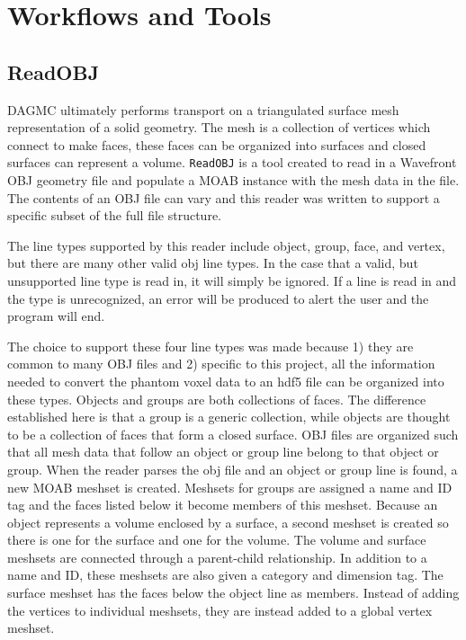 \clearpage
\section{Workflows and Tools}


\subsection{ReadOBJ}
DAGMC ultimately performs transport on a triangulated surface mesh representation of a solid geometry.
The mesh is a collection of vertices which connect to make faces, these faces can be organized into 
surfaces and closed surfaces can represent a volume.  \texttt{ReadOBJ} is a tool created to read in a Wavefront OBJ
geometry file and populate a MOAB instance with the mesh data in the file.  The contents of an OBJ file 
can vary \cite{obj} and this reader was written to support a specific subset of the full file structure. 

The line types supported by this reader include object, group, face, and vertex, 
but there are many other valid obj line types.  
In the case that a valid, but unsupported line type is read in, it will simply be ignored.  
If a line is read in and the type is unrecognized, an error will be produced to alert the user
 and the program will end.  

The choice to support these four line types was made because 1) they are common to many OBJ files
and 2) specific to this project, all the information needed to convert the phantom voxel data
to an hdf5 file can be organized into these types.  Objects and groups are both collections
of faces.  The difference established here is that a group is a generic collection, 
while objects are thought to be a collection of faces that form a closed surface.  
OBJ files are organized such that all mesh data that follow an object or group line belong to
that object or group.  When the reader parses the obj file and an object 
or group line is found, a new MOAB meshset is created.  Meshsets for groups are assigned a name 
and ID tag and the faces listed below it become members of this meshset.  Because an object 
represents a volume enclosed by a surface, a second meshset is created so there is one for the surface 
and one for the volume.  The volume and surface meshsets are connected through a parent-child relationship.  
In addition to a name and ID, these meshsets are also given a category and dimension tag.  The surface
meshset has the faces below the object line as members.  Instead of adding the vertices to individual meshsets,
they are instead added to a global vertex meshset.

